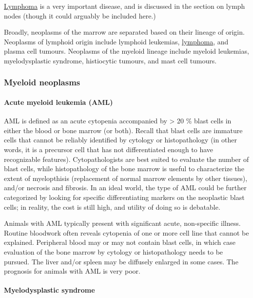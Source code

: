 \documentclass[openany]{article}
\let\oldparagraph\paragraph
\renewcommand{\paragraph}[1]{\oldparagraph{#1}\mbox{}}
\begin{document}
\protect\hyperlink{primary-neoplasia}{Lymphoma} is a very important
disease, and is discussed in the section on lymph nodes (though it could
arguably be included here.)

Broadly, neoplasms of the marrow are separated based on their lineage of
origin. Neoplasms of lymphoid origin include lymphoid leukemias,
\protect\hyperlink{primary-neoplasia}{lymphoma}, and plasma cell
tumours. Neoplasms of the myeloid lineage include myeloid leukemias,
myelodysplastic syndrome, histiocytic tumours, and mast cell tumours.

\subsubsection{Myeloid neoplasms}\label{myeloid-neoplasms}

\hypertarget{acute-myeloid-leukemia-aml}{\paragraph{Acute myeloid
leukemia (AML)}\label{acute-myeloid-leukemia-aml}}

AML is defined as an acute cytopenia accompanied by \textgreater{} 20 \%
blast cells in either the blood or bone marrow (or both). Recall that
blast cells are immature cells that cannot be reliably identified by
cytology or histopathology (in other words, it is a precursor cell that
has not differentiated enough to have recognizable features).
Cytopathologists are best suited to evaluate the number of blast cells,
while histopathology of the bone marrow is useful to characterize the
extent of myelopthisis (replacement of normal marrow elements by other
tissues), and/or necrosis and fibrosis. In an ideal world, the type of
AML could be further categorized by looking for specific differentiating
markers on the neoplastic blast cells; in reality, the cost is still
high, and utility of doing so is debatable.

Animals with AML typically present with significant acute, non-specific
illness. Routine bloodwork often reveals cytopenia of one or more cell
line that cannot be explained. Peripheral blood may or may not contain
blast cells, in which case evaluation of the bone marrow by cytology or
histopathology needs to be pursued. The liver and/or spleen may be
diffusely enlarged in some cases. The prognosis for animals with AML is
very poor.

\paragraph{Myelodysplastic syndrome}\label{myelodysplastic-syndrome}
\end{document}
